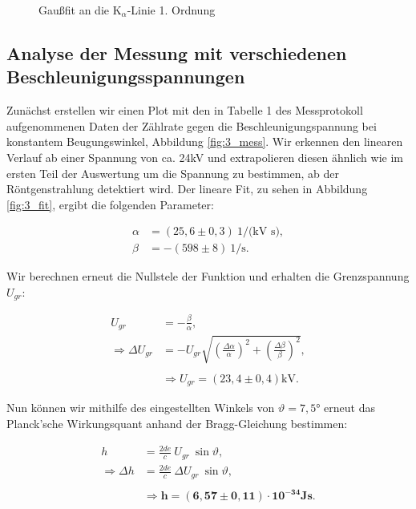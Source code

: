 \documentclass{article}
\begin{document}
\begin{figure}[!p]
    \centering
    \caption{Gaußfit an die K$_\alpha$-Linie 1. Ordnung}
    \label{fig:2hwb}
\end{figure}

\clearpage
\newpage

\subsection{Analyse der Messung mit verschiedenen Beschleunigungsspannungen}

Zunächst erstellen wir einen Plot mit den in Tabelle 1 des Messprotokoll aufgenommenen Daten der Zählrate gegen die Beschleunigungspannung bei konstantem Beugungswinkel, Abbildung \ref{fig:3_mess}. Wir erkennen den linearen Verlauf ab einer Spannung von ca. 24kV und extrapolieren diesen ähnlich wie im ersten Teil der Auswertung um die Spannung zu bestimmen, ab der Röntgenstrahlung detektiert wird. Der lineare Fit, zu sehen in Abbildung \ref{fig:3_fit}, ergibt die folgenden Parameter:

\begin{equation}
    \begin{split}
        \alpha &= (25,6\pm 0,3) \ \text{1/(kV s)}, \\
        \beta &= -(598 \pm 8) \ \text{1/s}. 
    \end{split}
\end{equation}

Wir berechnen erneut die Nullstele der Funktion und erhalten die Grenzspannung $U_{gr}$:

\begin{equation}
    \begin{split}
        U_{gr} &= - \frac{\beta}{\alpha}, \\
        \Rightarrow \Delta U_{gr} &= -U_{gr} \sqrt{\left( \frac{\Delta \alpha}{\alpha} \right)^2 + \left( \frac{\Delta \beta}{\beta} \right)^2}, \\ \\
        &\Rightarrow U_{gr} = (23,4 \pm 0,4)\text{kV}.
    \end{split}
\end{equation}

Nun können wir mithilfe des eingestellten Winkels von $\vartheta = 7,5$° erneut das Planck'sche Wirkungsquant anhand der Bragg-Gleichung bestimmen:

\begin{equation}
    \begin{split}
        h &= \frac{2de}{c} \ U_{gr} \ \sin \vartheta, \\
        \Rightarrow \Delta h &= \frac{2de}{c} \ \Delta U_{gr} \ \sin \vartheta, \\ \\
        &\Rightarrow \bm{h = (6,57 \pm 0,11) \cdot 10^{-34}} \textbf{Js}.  
    \end{split}
\end{equation}
\end{document}
